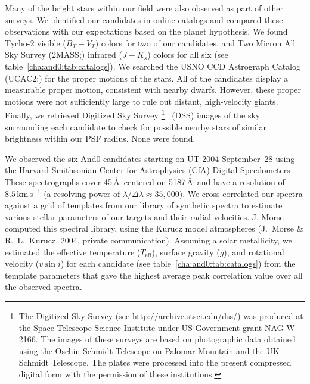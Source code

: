 Many of the bright stars within our field were also observed as part of other surveys.
We identified our candidates in online catalogs and compared these observations with our expectations based on the
planet hypothesis. We found Tycho-2 \citep{Hog_Fabricius_Makarov:aa:2000b, Hog_Fabricius_Makarov:aa:2000a}
visible ($B_{T}-V_{T}$) colors for two of our candidates, and Two Micron All Sky Survey
(2MASS;\@\citealt{Cutri_Skrutskie_van-Dyk:2003a}) infrared ($J-K_{s}$) colors for all six
(see table~\ref{cha:and0:tab:catalogs}). We searched the USNO CCD Astrograph Catalog
(UCAC2;\@\citealt{Zacharias_Urban_Zacharias:aj:2004a}) for the proper motions of the stars.
All of the candidates display a measurable proper motion, consistent with nearby dwarfs.
However, these proper motions were not sufficiently large to rule out distant, high-velocity giants.
Finally, we retrieved Digitized Sky Survey%
\footnote{The {Digitized Sky Survey} (see \url{http://archive.stsci.edu/dss/}) was produced at the Space Telescope Science Institute under US Government grant NAG W-2166. The images of these surveys are based on photographic data obtained using the Oschin Schmidt Telescope on Palomar Mountain and the UK Schmidt Telescope. The plates were processed into the present compressed digital form with the permission of these institutions.}%
\ (DSS) images of the sky surrounding each candidate to check for possible nearby stars of similar brightness within our PSF radius. None were found.

We observed the six And0 candidates starting on UT 2004 September~28 using
the Harvard-Smithsonian Center for Astrophysics (CfA) Digital Speedometers \citep{Latham:ASP:1992a}. These spectrographs cover 45\,\AA\ centered on 5187\,\AA\, and have a resolution of $8.5\,\mathrm{km\,s^{-1}}$ (a resolving power of $\lambda / \Delta \lambda \approx 35,\!000$). We cross-correlated our spectra against a grid of templates from our library of synthetic spectra to estimate various stellar parameters of our targets and their radial velocities. J. Morse computed this spectral library, using the Kurucz model atmospheres (J.~Morse \& R.~L.~Kurucz, 2004, private communication).
Assuming a solar metallicity, we estimated the effective temperature ($T_{\mathrm{eff}}$), surface gravity ($g$), and rotational velocity ($v \sin{i}$) for each candidate (see table~\ref{cha:and0:tab:catalogs}) from the template parameters that gave the highest average peak correlation value over all the observed spectra.

